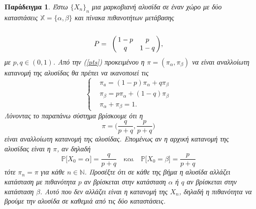 \documentclass[11pt]{article}
\newtheorem{example}{Παράδειγμα}
\def\N{\mathbb{N}}
\def\X{\mathbb{X}}
\def\P{\mathbb{P}}
\newcommand{\PP}[1]{\P\big[#1\big]}
\begin{document}
\begin{example}
Έστω $\{X_n\}_n$  μια μαρκοβιανή αλυσίδα σε έναν χώρο με δύο καταστάσεις $\X=\{\alpha,\beta\}$ και πίνακα πιθανοτήτων μετάβασης
\[
{P}=\bordermatrix{&&\cr
&1-p&p\cr
&q&1-q\cr
},
\]
με $p,q\in(0,1)$. Από την (\ref{pts}) προκειμένου η $\pi=(\pi_\alpha,\pi_\beta)$ να είναι αναλλοίωτη κατανομή της αλυσίδας θα πρέπει να ικανοποιεί τις
\[
\begin{cases}&\pi_a=(1-p)\pi_\alpha+q\pi_\beta\\ &\pi_\beta=p\pi_\alpha+(1-q)\pi_\beta\\&\pi_\alpha+\pi_\beta=1.\end{cases}
\]
Λύνοντας το παραπάνω σύστημα βρίσκουμε ότι η
\[
\pi=\big(\frac{q}{p+q},\frac{p}{p+q}\big)
\]
είναι αναλλοίωτη κατανομή της αλυσίδας. Επομένως αν η αρχική κατανομή της αλυσίδας είναι η $\pi$, αν δηλαδή
\[
\PP{X_0=\alpha}=\frac{q}{p+q}\quad\text{και}\quad\PP{X_0=\beta}=\frac{p}{p+q}
\]
τότε $\pi_n=\pi$ για κάθε $n\in\N$. Προσέξτε ότι σε κάθε της βήμα η αλυσίδα αλλάζει κατάσταση με πιθανότητα $p$ αν βρίσκεται στην κατάσταση $\alpha$ ή $q$ αν βρίσκεται στην κατάσταση $\beta$. Αυτό που δεν αλλάζει είναι η κατανομή της $X_n$, δηλαδή η πιθανότητα να βρούμε την αλυσίδα σε καθεμιά από τις δύο καταστάσεις.
\end{example}
\end{document}

